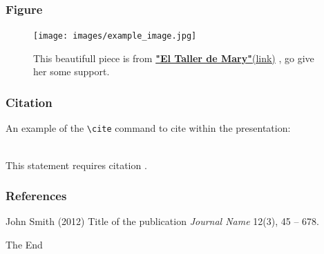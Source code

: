 \documentclass[14.5pt]{beamer}
\begin{document}

\begin{frame}
\frametitle{Figure}
\begin{figure}
\texttt{[image: images/example\_image.jpg]}
\caption{This beautifull piece is from \href{https://www.facebook.com/El-Taller-de-Mary-467073823467562}{\textbf{"El Taller de Mary"}(link)} , go give her some support.}
\end{figure}
\end{frame}


\begin{frame}[fragile] %
\frametitle{Citation}
An example of the \verb|\cite| command to cite within the presentation:\\~

This statement requires citation \cite{p1}.
\end{frame}


\begin{frame}
\frametitle{References}
\footnotesize{
\begin{thebibliography}{99} %
 John Smith (2012)
\newblock Title of the publication
\newblock \emph{Journal Name} 12(3), 45 -- 678.
\end{thebibliography}
}
\end{frame}


\begin{frame}
\Huge{\centerline{The End}}
\end{frame}

\end{document}
